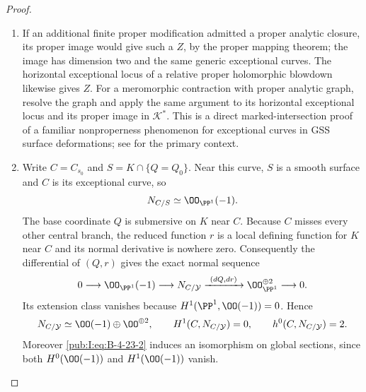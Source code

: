 \begin{proof}
\begin{enumerate}[label=\arabic*.,leftmargin=*]
\item If an additional finite proper modification admitted a
proper analytic closure, its proper image would give
such a $Z$, by the proper mapping theorem; the image has
dimension two and the same generic exceptional curves.
The horizontal exceptional locus of a relative proper
holomorphic blowdown likewise gives $Z$. For a meromorphic
contraction with proper analytic graph, resolve the graph
and apply the same argument to its horizontal exceptional
locus and its proper image in $\mathcal K^*$.
This is a direct marked-intersection proof of a familiar
nonproperness phenomenon for exceptional curves in GSS
surface deformations; see
\citet[arXiv version~2, Section~1.2, PDF pp.~3--5]{DlousskyTeleman2012AB} for the primary
context.

\item Write
$C=C_{s_0}$ and $S=K\cap\{Q=Q_0\}$. Near this curve,
$S$ is a smooth surface and $C$ is its exceptional curve,
so
\[
 N_{C/S}\simeq\OO_{\PP^1}(-1).
\]
The base coordinate $Q$ is submersive on $K$ near $C$.
Because $C$ misses every other central branch, the reduced
function $r$ is a local defining function for $K$ near
$C$ and its normal derivative is nowhere zero.
Consequently the differential of $(Q,r)$ gives the exact
normal sequence
\begin{equation}
 0\longrightarrow\OO_{\PP^1}(-1)
 \longrightarrow N_{C/\mathcal Y}
 \xrightarrow{\ (dQ,dr)\ }
 \OO_{\PP^1}^{\oplus2}\longrightarrow0.
\label{pub:I:eq:B-4-23-2}
\end{equation}
Its extension class vanishes because
$H^1(\PP^1,\OO(-1))=0$. Hence
\begin{equation}
 N_{C/\mathcal Y}\simeq
 \OO(-1)\oplus\OO^{\oplus2},\qquad
 H^1(C,N_{C/\mathcal Y})=0,\qquad
 h^0(C,N_{C/\mathcal Y})=2.
\label{pub:I:eq:B-4-23-3}
\end{equation}
Moreover \eqref{pub:I:eq:B-4-23-2} induces an isomorphism on global
sections, since both $H^0(\OO(-1))$ and $H^1(\OO(-1))$
vanish.


\end{enumerate}
\end{proof}
